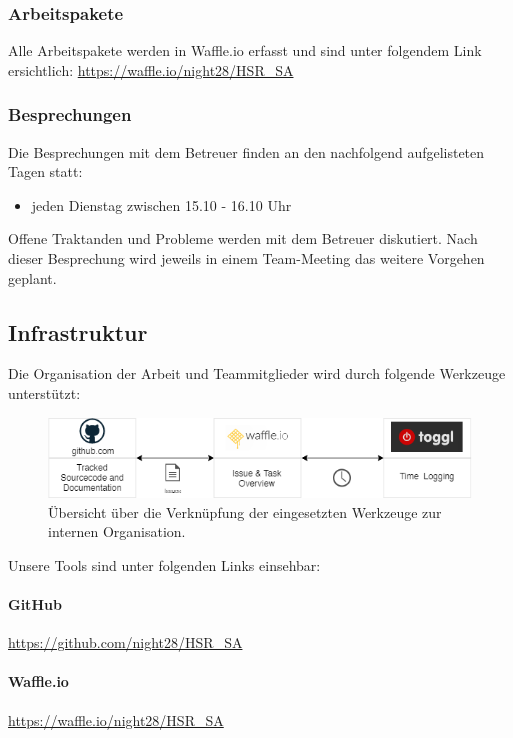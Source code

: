 \subsubsection{Arbeitspakete}
Alle Arbeitspakete werden in Waffle.io erfasst und sind unter folgendem Link ersichtlich:
\href{Waffle.io}{https://waffle.io/night28/HSR\_SA}
\subsubsection{Besprechungen}
Die Besprechungen mit dem Betreuer finden an den nachfolgend aufgelisteten Tagen statt:
\begin{itemize}
	\item jeden Dienstag zwischen 15.10 - 16.10 Uhr
\end{itemize}

Offene Traktanden und Probleme werden mit dem Betreuer diskutiert. Nach dieser Besprechung wird jeweils in einem Team-Meeting das weitere Vorgehen geplant.


\subsection{Infrastruktur}
Die Organisation der Arbeit und Teammitglieder wird durch folgende Werkzeuge unterstützt:

\begin{figure}[H]
	\centering
	\includegraphics[width=13cm]{img/EingesetzteToolsZurOrganisation.png}
	\caption{Übersicht über die Verknüpfung der eingesetzten Werkzeuge zur internen Organisation.}
	\label{fig:Interne Organisationsstruktur}
\end{figure} 

Unsere Tools sind unter folgenden Links einsehbar:
\paragraph{GitHub} \href{https://github.com/night28/HSR_SA}{https://github.com/night28/HSR\_SA} 

\paragraph{Waffle.io} \href{https://waffle.io/night28/HSR\_SA}{https://waffle.io/night28/HSR\_SA}

